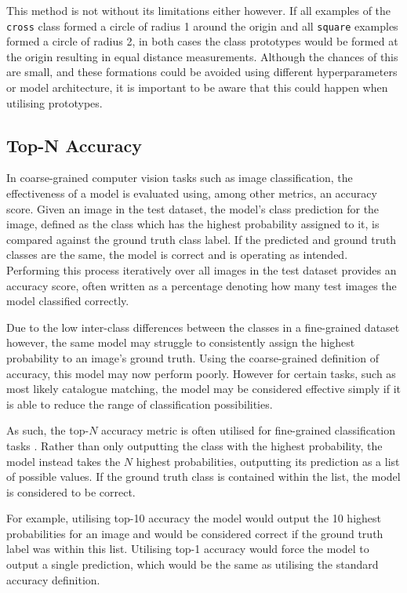 This method is not without its limitations either however. If all examples of the \texttt{cross} class formed a circle of radius 1 around the origin and all \texttt{square} examples formed a circle of radius 2, in both cases the class prototypes would be formed at the origin resulting in equal distance measurements. Although the chances of this are small, and these formations could be avoided using different hyperparameters or model architecture, it is important to be aware that this could happen when utilising prototypes. 

\subsection{Top-N Accuracy}\label{ch:ID,sec:SNNBackground,subsec:TopNAccuracy}

In coarse-grained computer vision tasks such as image classification, the effectiveness of a model is evaluated using, among other metrics, an accuracy score. Given an image in the test dataset, the model's class prediction for the image, defined as the class which has the highest probability assigned to it, is compared against the ground truth class label. If the predicted and ground truth classes are the same, the model is correct and is operating as intended. Performing this process iteratively over all images in the test dataset provides an accuracy score, often written as a percentage denoting how many test images the model classified correctly.

Due to the low inter-class differences between the classes in a fine-grained dataset however, the same model may struggle to consistently assign the highest probability to an image's ground truth. Using the coarse-grained definition of accuracy, this model may now perform poorly. However for certain tasks, such as most likely catalogue matching, the model may be considered effective simply if it is able to reduce the range of classification possibilities.

As such, the top-$N$ accuracy metric is often utilised for fine-grained classification tasks \cite{yang_large-scale_2015, gao_towards_2021, brust_towards_2017}. Rather than only outputting the class with the highest probability, the model instead takes the $N$ highest probabilities, outputting its prediction as a list of possible values. If the ground truth class is contained within the list, the model is considered to be correct. 

For example, utilising top-10 accuracy the model would output the 10 highest probabilities for an image and would be considered correct if the ground truth label was within this list. Utilising top-1 accuracy would force the model to output a single prediction, which would be the same as utilising the standard accuracy definition. 

